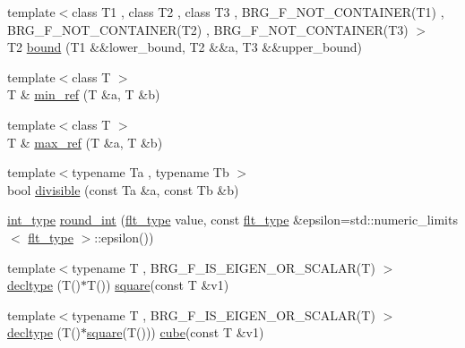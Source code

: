 \begin{DoxyCompactItemize}
\item 
{\footnotesize template$<$class T1 , class T2 , class T3 , B\-R\-G\-\_\-\-F\-\_\-\-N\-O\-T\-\_\-\-C\-O\-N\-T\-A\-I\-N\-E\-R(\-T1) , B\-R\-G\-\_\-\-F\-\_\-\-N\-O\-T\-\_\-\-C\-O\-N\-T\-A\-I\-N\-E\-R(\-T2) , B\-R\-G\-\_\-\-F\-\_\-\-N\-O\-T\-\_\-\-C\-O\-N\-T\-A\-I\-N\-E\-R(\-T3) $>$ }\\T2 \hyperlink{namespaceIceBRG_a44be96a2452436d8bc78acc2f1c74daf}{bound} (T1 \&\&lower\-\_\-bound, T2 \&\&a, T3 \&\&upper\-\_\-bound)
\item 
{\footnotesize template$<$class T $>$ }\\T \& \hyperlink{namespaceIceBRG_a8b6724cfb5d64ace2a219237a6897988}{min\-\_\-ref} (T \&a, T \&b)
\item 
{\footnotesize template$<$class T $>$ }\\T \& \hyperlink{namespaceIceBRG_a653dff34ed3915f793d34fd1e14126c0}{max\-\_\-ref} (T \&a, T \&b)
\item 
{\footnotesize template$<$typename Ta , typename Tb $>$ }\\bool \hyperlink{namespaceIceBRG_a9b71ab7234b6b6db9f6d292fe1ac4da8}{divisible} (const Ta \&a, const Tb \&b)
\item 
\hyperlink{lib_2IceBRG__main_2common_8h_ac4de9d9335536ac22821171deec8d39e}{int\-\_\-type} \hyperlink{namespaceIceBRG_a26b76a1dceee5e7c257d09c006a28b4b}{round\-\_\-int} (\hyperlink{lib_2IceBRG__main_2common_8h_ad0f130a56eeb944d9ef2692ee881ecc4}{flt\-\_\-type} value, const \hyperlink{lib_2IceBRG__main_2common_8h_ad0f130a56eeb944d9ef2692ee881ecc4}{flt\-\_\-type} \&epsilon=std\-::numeric\-\_\-limits$<$ \hyperlink{lib_2IceBRG__main_2common_8h_ad0f130a56eeb944d9ef2692ee881ecc4}{flt\-\_\-type} $>$\-::epsilon())
\item 
{\footnotesize template$<$typename T , B\-R\-G\-\_\-\-F\-\_\-\-I\-S\-\_\-\-E\-I\-G\-E\-N\-\_\-\-O\-R\-\_\-\-S\-C\-A\-L\-A\-R(\-T) $>$ }\\\hyperlink{namespaceIceBRG_a528e5024ecab03049320529180ae84a8}{decltype} (T()$\ast$T()) \hyperlink{namespaceIceBRG_a97aa4e94a7b6218fcb6f9689e1f6b557}{square}(const T \&v1)
\item 
{\footnotesize template$<$typename T , B\-R\-G\-\_\-\-F\-\_\-\-I\-S\-\_\-\-E\-I\-G\-E\-N\-\_\-\-O\-R\-\_\-\-S\-C\-A\-L\-A\-R(\-T) $>$ }\\\hyperlink{namespaceIceBRG_a39844460c8914251530308d9c374f182}{decltype} (T()$\ast$\hyperlink{namespaceIceBRG_a97aa4e94a7b6218fcb6f9689e1f6b557}{square}(T())) \hyperlink{namespaceIceBRG_a2cdc8520f62b9c88cfcd50132fd80ee4}{cube}(const T \&v1)

\end{DoxyCompactItemize}
